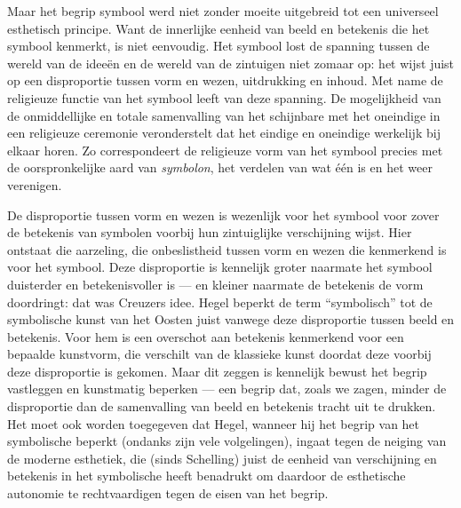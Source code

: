 Maar het begrip symbool werd niet zonder moeite uitgebreid tot een universeel esthetisch principe. Want de innerlijke eenheid van beeld en betekenis die het symbool kenmerkt, is niet eenvoudig. Het symbool lost de spanning tussen de wereld van de ideeën en de wereld van de zintuigen niet zomaar op: het wijst juist op een disproportie tussen vorm en wezen, uitdrukking en inhoud. Met name de religieuze functie van het symbool leeft van deze spanning. De mogelijkheid van de onmiddellijke en totale samenvalling van het schijnbare met het oneindige in een religieuze ceremonie veronderstelt dat het eindige en oneindige werkelijk bij elkaar horen. Zo correspondeert de religieuze vorm van het symbool precies met de oorspronkelijke aard van \textit{symbolon}, het verdelen van wat één is en het weer verenigen.

De disproportie tussen vorm en wezen is wezenlijk voor het symbool voor zover de betekenis van symbolen voorbij hun zintuiglijke verschijning wijst. Hier ontstaat die aarzeling, die onbeslistheid tussen vorm en wezen die kenmerkend is voor het symbool. Deze disproportie is kennelijk groter naarmate het symbool duisterder en betekenisvoller is — en kleiner naarmate de betekenis de vorm doordringt: dat was Creuzers idee. Hegel beperkt de term ``symbolisch'' tot de symbolische kunst van het Oosten juist vanwege deze disproportie tussen beeld en betekenis. Voor hem is een overschot aan betekenis kenmerkend voor een bepaalde kunstvorm, die verschilt van de klassieke kunst doordat deze voorbij deze disproportie is gekomen. Maar dit zeggen is kennelijk bewust het begrip vastleggen en kunstmatig beperken — een begrip dat, zoals we zagen, minder de disproportie dan de samenvalling van beeld en betekenis tracht uit te drukken. Het moet ook worden toegegeven dat Hegel, wanneer hij het begrip van het symbolische beperkt (ondanks zijn vele volgelingen), ingaat tegen de neiging van de moderne esthetiek, die (sinds Schelling) juist de eenheid van verschijning en betekenis in het symbolische heeft benadrukt om daardoor de esthetische autonomie te rechtvaardigen tegen de eisen van het begrip.

